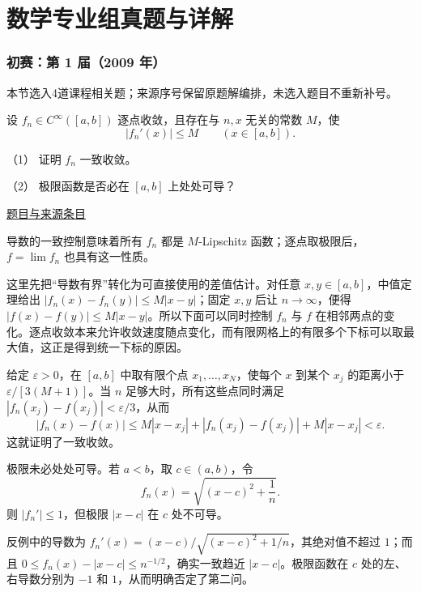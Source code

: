 \documentclass[12pt,fontset=fandol]{ctexart}
\begin{document}
\part{数学专业组真题与详解}

\section{初赛：第 1 届（2009 年）}

本节选入4道课程相关题；来源序号保留原题解编排，未选入题目不重新补号。

\begin{example}[来源序号4]\label{ex:pre01-math:4}\label{pr:pre01-math:4}

设 $f_n\in C^\infty([a,b])$ 逐点收敛，且存在与 $n,x$ 无关的常数 $M$，使
\[
|f_n'(x)|\le M\qquad(x\in[a,b]).
\]

（1） 证明 $f_n$ 一致收敛。

（2） 极限函数是否必在 $[a,b]$ 上处处可导？

\par\href{https://github.com/lzxcr/cmc-mathematics/blob/64916fa1fdbc3e444a652eca204d5669058ee321/src/problems/preliminary/01/04.md}{题目与来源条目}

\end{example}

\begin{solve}\label{ans:pre01-math:4}

导数的一致控制意味着所有 $f_n$ 都是 $M$-Lipschitz 函数；逐点取极限后，$f=\lim f_n$ 也具有这一性质。

这里先把“导数有界”转化为可直接使用的差值估计。对任意 $x,y\in[a,b]$，中值定理给出 $|f_n(x)-f_n(y)|\le M|x-y|$；固定 $x,y$ 后让 $n\to\infty$，便得 $|f(x)-f(y)|\le M|x-y|$。所以下面可以同时控制 $f_n$ 与 $f$ 在相邻两点的变化。逐点收敛本来允许收敛速度随点变化，而有限网格上的有限多个下标可以取最大值，这正是得到统一下标的原因。

给定 $\varepsilon>0$，在 $[a,b]$ 中取有限个点 $x_1,\ldots,x_N$，使每个 $x$ 到某个 $x_j$ 的距离小于 $\varepsilon/[3(M+1)]$。当 $n$ 足够大时，所有这些点同时满足 $|f_n(x_j)-f(x_j)|<\varepsilon/3$，从而
\[
|f_n(x)-f(x)|
\le M|x-x_j|+|f_n(x_j)-f(x_j)|+M|x-x_j|<\varepsilon.
\]
这就证明了一致收敛。

极限未必处处可导。若 $a<b$，取 $c\in(a,b)$，令
\[
f_n(x)=\sqrt{(x-c)^2+\frac1n}.
\]
则 $|f_n'|\le1$，但极限 $|x-c|$ 在 $c$ 处不可导。

反例中的导数为 $f_n'(x)=(x-c)/\sqrt{(x-c)^2+1/n}$，其绝对值不超过 $1$；而且 $0\le f_n(x)-|x-c|\le n^{-1/2}$，确实一致趋近 $|x-c|$。极限函数在 $c$ 处的左、右导数分别为 $-1$ 和 $1$，从而明确否定了第二问。

\end{solve}
\end{document}
